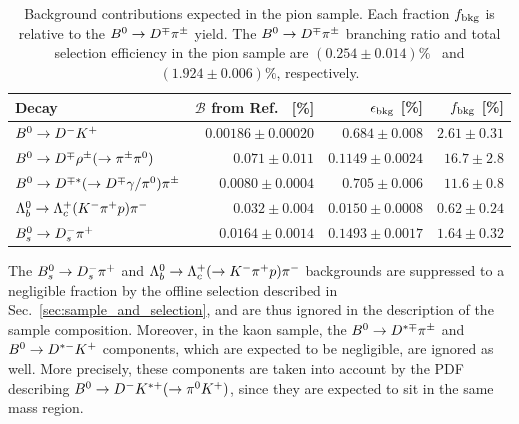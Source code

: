 \begin{table}[t]
	\centering
	\begin{tabular}{lrrr}
		\toprule
		Decay & $\mathcal{B}$ from Ref.~\cite{PDG2017} [\%] & $\epsilon_{\rm bkg}$ [\%] & $f_{\rm bkg}$ [\%] \\
		\midrule
		$B^0\rightarrow D^-K^+$ 			  			      & $0.00186\pm0.00020$ & $0.684\pm0.008$   & $2.61\pm0.31$ \\
		$B^0\rightarrow D^\mp\rho^\pm(\rightarrow\pi^\pm\pi^0)$ 			      & $0.071\pm0.011$     & $0.1149\pm0.0024$ & $16.7\pm2.8$  \\
		$B^0\rightarrow D^{\mp*}(\rightarrow D^\mp\gamma/\pi^{0})\pi^\pm$ 	  & $0.0080\pm0.0004$   & $0.705\pm0.006$   & $11.6\pm0.8$  \\
		$\Lambda_{b}^0\rightarrow\Lambda_{c}^{+}(K^-\pi^+ p)\pi^-$ & $0.032\pm0.004$     & $0.0150\pm0.0008$ & $0.62\pm0.24$ \\
		$B^0_s\rightarrow D^-_s\pi^+$ 					  & $0.0164\pm 0.0014$     & $0.1493\pm0.0017$ & $1.64\pm0.32$   \\
		\bottomrule
	\end{tabular}
	\caption{Background contributions expected in the pion sample. Each fraction $f_{\rm bkg}$ is relative to the $B^0\rightarrow D^\mp\pi^\pm$ yield. 
	The $B^0\rightarrow D^\mp\pi^\pm$ branching ratio and total selection efficiency in the pion sample are
	$(0.254 \pm 0.014)\%$~\cite{PDG2017} and $(1.924\pm0.006)\%$, respectively.
	\label{tab:expected-backgrounds}
	}
\end{table}

The $B^0_s\rightarrow D^-_s\pi^+$ and $\Lambda_{b}^0\rightarrow\Lambda_{c}^{+}(\rightarrow K^-\pi^+ p)\pi^-$
backgrounds are suppressed to a negligible fraction by the offline selection
described in Sec.~\ref{sec:sample_and_selection}, and are thus ignored in the
description of the sample composition. Moreover, in the kaon sample, the $B^0\rightarrow
D^{*\mp}\pi^\pm$ and $B^0\rightarrow D^{*-}K^+$ components, which are expected to be negligible,
are ignored as well. More precisely, these components are taken into
account by the PDF describing $B^0\rightarrow D^- K^{*+}(\rightarrow\pi^{0}K^+)$, since they are
expected to sit in the same mass region.
